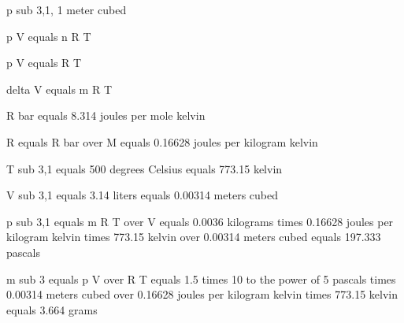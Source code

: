p sub 3,1, 1 meter cubed

p V equals n R T

p V equals R T

delta V equals m R T

R bar equals 8.314 joules per mole kelvin

R equals R bar over M equals 0.16628 joules per kilogram kelvin

T sub 3,1 equals 500 degrees Celsius equals 773.15 kelvin

V sub 3,1 equals 3.14 liters equals 0.00314 meters cubed

p sub 3,1 equals m R T over V equals 0.0036 kilograms times 0.16628 joules per kilogram kelvin times 773.15 kelvin over 0.00314 meters cubed equals 197.333 pascals

m sub 3 equals p V over R T equals 1.5 times 10 to the power of 5 pascals times 0.00314 meters cubed over 0.16628 joules per kilogram kelvin times 773.15 kelvin equals 3.664 grams